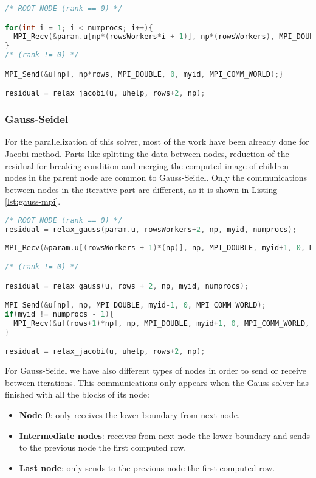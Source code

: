 \documentclass[a4paper, 10pt]{article}
\begin{document}
\begin{lstlisting}[language=c, caption={Communication of the computed image to the parent}]
/* ROOT NODE (rank == 0) */

for(int i = 1; i < numprocs; i++){
  MPI_Recv(&param.u[np*(rowsWorkers*i + 1)], np*(rowsWorkers), MPI_DOUBLE, i, i, MPI_COMM_WORLD, &status);
}
/* (rank != 0) */

MPI_Send(&u[np], np*rows, MPI_DOUBLE, 0, myid, MPI_COMM_WORLD);}

residual = relax_jacobi(u, uhelp, rows+2, np);
\end{lstlisting}


\subsubsection{Gauss-Seidel}

For the parallelization of this solver, most of the work have been already done for Jacobi method. Parts like splitting the data between nodes, reduction of the residual for breaking condition and merging the computed image of children nodes in the parent node are common to Gauss-Seidel. Only the communications between nodes in the iterative part are different, as it is shown in Listing \ref{lst:gauss-mpi}.

\begin{lstlisting}[language=c, caption={Communications between nodes Gauss-Seidel}, label={lst:gauss-mpi}]
/* ROOT NODE (rank == 0) */
residual = relax_gauss(param.u, rowsWorkers+2, np, myid, numprocs);
 
MPI_Recv(&param.u[(rowsWorkers + 1)*(np)], np, MPI_DOUBLE, myid+1, 0, MPI_COMM_WORLD, &status);

/* (rank != 0) */

residual = relax_gauss(u, rows + 2, np, myid, numprocs);   

MPI_Send(&u[np], np, MPI_DOUBLE, myid-1, 0, MPI_COMM_WORLD);
if(myid != numprocs - 1){
  MPI_Recv(&u[(rows+1)*np], np, MPI_DOUBLE, myid+1, 0, MPI_COMM_WORLD, &status);
}

residual = relax_jacobi(u, uhelp, rows+2, np);
\end{lstlisting}

For Gauss-Seidel we have also different types of nodes in order to send or receive between iterations. This communications only appears when the Gauss solver has finished with all the blocks of its node:

\begin{itemize}
  \item \textbf{Node 0}: only receives the lower boundary from next node.
  \item \textbf{Intermediate nodes}: receives from next node the lower boundary and sends to the previous node the first computed row.
  \item \textbf{Last node}: only sends to the previous node the first computed row.
\end{itemize}
\end{document}
